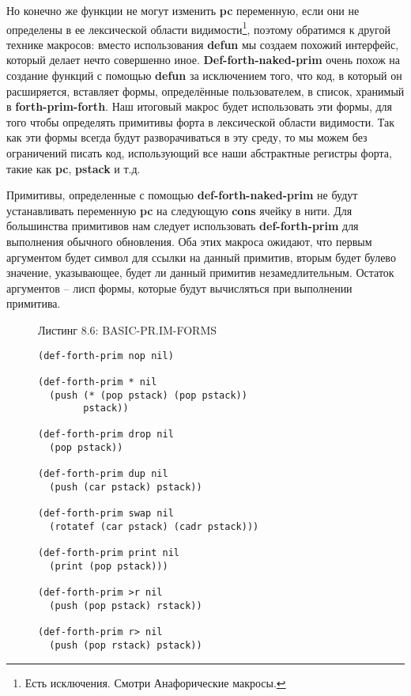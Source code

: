 Но конечно же функции не могут изменить \textbf{pc} переменную, если они не определены в ее лексической области видимости\footnote{Есть исключения. Смотри Анафорические макросы.}, поэтому обратимся к другой технике макросов: вместо использования \textbf{defun} мы создаем похожий интерфейс, который делает нечто совершенно иное. \textbf{Def-forth-naked-prim} очень похож на создание функций с помощью \textbf{defun} за исключением того, что код, в который он расширяется, вставляет формы, определённые пользователем, в список, хранимый в \textbf{forth-prim-forth}. Наш итоговый макрос будет использовать эти формы, для того чтобы определять примитивы форта в лексической области видимости. Так как эти формы всегда будут разворачиваться в эту среду, то мы можем без ограничений писать код, использующий все наши абстрактные регистры форта, такие как \textbf{pc}, \textbf{pstack} и т.д.

Примитивы, определенные с помощью \textbf{def-forth-naked-prim} не будут устанавливать переменную \textbf{pc} на следующую \textbf{cons} ячейку в нити. Для большинства примитивов нам следует использовать \textbf{def-forth-prim} для выполнения обычного обновления. Оба этих макроса ожидают, что первым аргументом будет символ для ссылки на данный примитив, вторым будет булево значение, указывающее, будет ли данный примитив незамедлительным. Остаток аргументов -- лисп формы, которые будут вычисляться при выполнении примитива.

\begin{figure}Листинг 8.6: BASIC-PR.IM-FORMS\label{listing_8.6}
  \listbegin
\begin{verbatim}
(def-forth-prim nop nil)

(def-forth-prim * nil
  (push (* (pop pstack) (pop pstack))
        pstack))

(def-forth-prim drop nil
  (pop pstack))

(def-forth-prim dup nil
  (push (car pstack) pstack))

(def-forth-prim swap nil
  (rotatef (car pstack) (cadr pstack)))

(def-forth-prim print nil
  (print (pop pstack)))

(def-forth-prim >r nil
  (push (pop pstack) rstack))

(def-forth-prim r> nil
  (push (pop rstack) pstack))
\end{verbatim}
  \listend
\end{figure}

